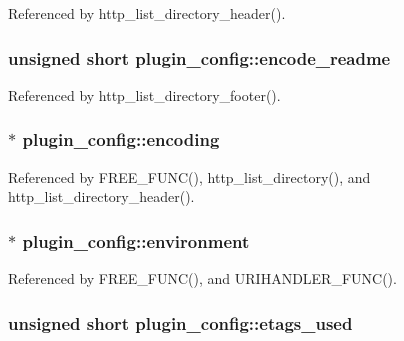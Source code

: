 Referenced by http\-\_\-list\-\_\-directory\-\_\-header().

\hypertarget{structplugin__config_a20695d2d3117f105313da889def722ed}{
\subsubsection[{encode\-\_\-readme}]{\setlength{\rightskip}{0pt plus 5cm}unsigned short plugin\-\_\-config\-::encode\-\_\-readme}}\label{structplugin__config_a20695d2d3117f105313da889def722ed}


Referenced by http\-\_\-list\-\_\-directory\-\_\-footer().

\hypertarget{structplugin__config_a0f9e219aa12e75027ecec74bfccebdb5}{
\subsubsection[{encoding}]{$\ast$ plugin\-\_\-config\-::encoding}}\label{structplugin__config_a0f9e219aa12e75027ecec74bfccebdb5}


Referenced by F\-R\-E\-E\-\_\-\-F\-U\-N\-C(), http\-\_\-list\-\_\-directory(), and http\-\_\-list\-\_\-directory\-\_\-header().

\hypertarget{structplugin__config_aed7cc4d4346ffca4a1a6f0a77865ceef}{
\subsubsection[{environment}]{$\ast$ plugin\-\_\-config\-::environment}}\label{structplugin__config_aed7cc4d4346ffca4a1a6f0a77865ceef}


Referenced by F\-R\-E\-E\-\_\-\-F\-U\-N\-C(), and U\-R\-I\-H\-A\-N\-D\-L\-E\-R\-\_\-\-F\-U\-N\-C().

\hypertarget{structplugin__config_ac802ef12eeb274f1f749ba6312c88834}{
\subsubsection[{etags\-\_\-used}]{\setlength{\rightskip}{0pt plus 5cm}unsigned short plugin\-\_\-config\-::etags\-\_\-used}}\label{structplugin__config_ac802ef12eeb274f1f749ba6312c88834}


